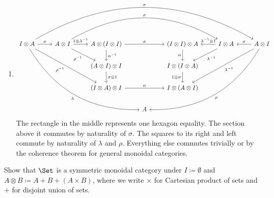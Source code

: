 \begin{answer}
\begin{enumerate}
\begin{enumerate}
    \item
      \[ \begin{tikzcd}
        I \otimes A
          \arrow[rrrrrr, bend left, "\sigma"]
          \arrow[r, "\sigma"]
          \arrow[rrdd, "\rho^{-1}"']
          \arrow[rrrddd, bend right, "\lambda"'] &
        A \otimes I
          \arrow[rrrr, bend left, "\sigma"]
          \arrow[r, "1 \otimes \lambda^{-1}"]
          \arrow[rd, "\rho^{-1}"'] &
        A \otimes (I \otimes I)
          \arrow[rr, "\sigma"]
          \arrow[d, "\alpha^{-1}"] &&
        (I \otimes I) \otimes A
          \arrow[d, "\alpha"'] &
        I \otimes A
          \arrow[l, "\lambda^{-1} \otimes 1"']
          \arrow[ld, "\lambda^{-1}"] &
        A \otimes I
          \arrow[l, "\sigma"']
          \arrow[lldd, "\lambda^{-1}"]
          \arrow[lllddd, bend left, "\rho"] \\
        && (A \otimes I) \otimes I
          \arrow[d, "\sigma \otimes 1"] &&
        I \otimes (I \otimes A)
          \arrow[d, "1 \otimes \sigma"'] \\
        && (I \otimes A) \otimes I
          \arrow[rr, "\alpha"] &&
        I \otimes (A \otimes I) \\
        &&& A
      \end{tikzcd} \]
      The rectangle in the middle represents one hexagon equality.
      The section above it commutes by naturality of $\sigma$.
      The squares to its right and left commute by naturality of $\lambda$ and $\rho$.
      Everything else commutes trivially or by the coherence theorem for general monoidal categories.
    \end{enumerate}
  \end{enumerate}
\end{answer}


\begin{exercise}
  Show that $\Set$ is a symmetric monoidal category under $I \coloneqq \emptyset$ and $A \otimes B \coloneqq A + B + (A \times B)$, where we write $\times$ for Cartesian product of sets and $+$ for disjoint union of sets.
\end{exercise}

